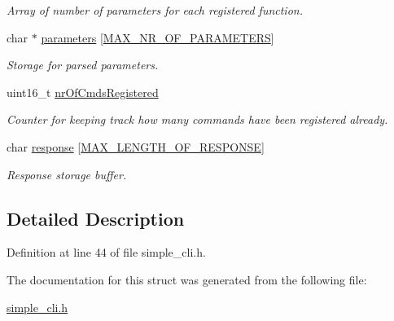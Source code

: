 \begin{DoxyCompactItemize}
\begin{DoxyCompactList}\small\item\em Array of number of parameters for each registered function. \end{DoxyCompactList}\item 
\hypertarget{structcli__t_a51e40c51fa276e7cc13a3e399c6b29e2}{char $\ast$ \hyperlink{structcli__t_a51e40c51fa276e7cc13a3e399c6b29e2}{parameters} \mbox{[}\hyperlink{group___s_i_m_p_l_e___c_l_i_gad8bacdd29d97762d63a242cba6444b32}{M\+A\+X\+\_\+\+N\+R\+\_\+\+O\+F\+\_\+\+P\+A\+R\+A\+M\+E\+T\+E\+R\+S}\mbox{]}}\label{structcli__t_a51e40c51fa276e7cc13a3e399c6b29e2}

\begin{DoxyCompactList}\small\item\em Storage for parsed parameters. \end{DoxyCompactList}\item 
\hypertarget{structcli__t_a644332672d347d16da5f567c1401ea33}{uint16\+\_\+t \hyperlink{structcli__t_a644332672d347d16da5f567c1401ea33}{nr\+Of\+Cmds\+Registered}}\label{structcli__t_a644332672d347d16da5f567c1401ea33}

\begin{DoxyCompactList}\small\item\em Counter for keeping track how many commands have been registered already. \end{DoxyCompactList}\item 
\hypertarget{structcli__t_a00caea38300895956a4d6b7e90e95232}{char \hyperlink{structcli__t_a00caea38300895956a4d6b7e90e95232}{response} \mbox{[}\hyperlink{group___s_i_m_p_l_e___c_l_i_ga17e61582091ee023dd2d011f13e8f971}{M\+A\+X\+\_\+\+L\+E\+N\+G\+T\+H\+\_\+\+O\+F\+\_\+\+R\+E\+S\+P\+O\+N\+S\+E}\mbox{]}}\label{structcli__t_a00caea38300895956a4d6b7e90e95232}

\begin{DoxyCompactList}\small\item\em Response storage buffer. \end{DoxyCompactList}\end{DoxyCompactItemize}


\subsection{Detailed Description}


Definition at line 44 of file simple\+\_\+cli.\+h.



The documentation for this struct was generated from the following file\+:\begin{DoxyCompactItemize}
\item 
\hyperlink{simple__cli_8h}{simple\+\_\+cli.\+h}\end{DoxyCompactItemize}
